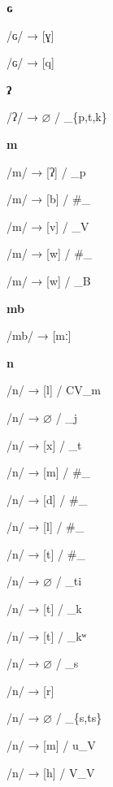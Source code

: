 \begin{center}\textbf{ɢ}\end{center}
\begin{multicols}{4}
\noindent /ɢ/ → [ɣ]

\noindent /ɢ/ → [q]
\end{multicols}

\begin{center}\textbf{ʔ}\end{center}
\begin{multicols}{4}
\noindent /ʔ/ → $\varnothing$ / \_\{p,t,k\}
\end{multicols}

\begin{center}\textbf{m}\end{center}
\begin{multicols}{4}
\noindent /m/ → [ʔ] / \_p

\noindent /m/ → [b] / \#\_

\noindent /m/ → [v] / \_V

\noindent /m/ → [w] / \#\_

\noindent /m/ → [w] / \_B
\end{multicols}

\begin{center}\textbf{mb}\end{center}
\begin{multicols}{4}
\noindent /mb/ → [mː]
\end{multicols}

\begin{center}\textbf{n}\end{center}
\begin{multicols}{4}
\noindent /n/ → [l] / CV\_m

\noindent /n/ → $\varnothing$ / \_j

\noindent /n/ → [x] / \_t

\noindent /n/ → [m] / \#\_

\noindent /n/ → [d] / \#\_

\noindent /n/ → [l] / \#\_

\noindent /n/ → [t] / \#\_

\noindent /n/ → $\varnothing$ / \_ti

\noindent /n/ → [t] / \_k

\noindent /n/ → [t] / \_kʷ

\noindent /n/ → $\varnothing$ / \_s

\noindent /n/ → [r]

\noindent /n/ → $\varnothing$ / \_\{s,ts\}

\noindent /n/ → [m] / u\_V

\noindent /n/ → [h] / V\_V

\end{multicols}

